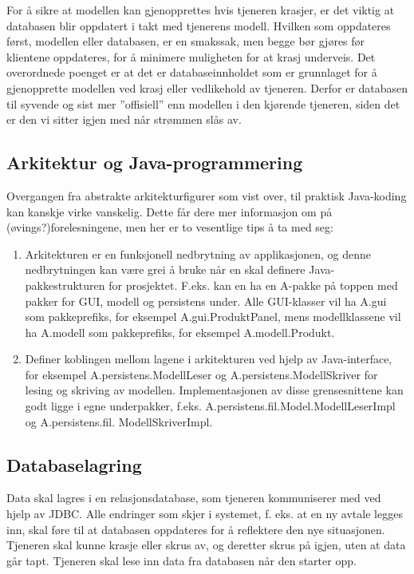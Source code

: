 For å sikre at modellen kan gjenopprettes hvis tjeneren krasjer, er det viktig at databasen blir oppdatert i takt med tjenerens modell. Hvilken som oppdateres først, modellen eller databasen, er en smakssak, men begge bør gjøres før klientene oppdateres, for å minimere muligheten for at krasj underveis. Det overordnede poenget er at det er databaseinnholdet som er grunnlaget for å gjenopprette modellen ved krasj eller vedlikehold av tjeneren. Derfor er databasen til syvende og sist mer ”offisiell” enn modellen i den kjørende tjeneren, siden det er den vi sitter igjen med når strømmen slås av.

\subsection{Arkitektur og Java-programmering}

Overgangen fra abstrakte arkitekturfigurer som vist over, til praktisk Java-koding kan kanskje virke vanskelig. Dette får dere mer informasjon om på (øvings?)forelesningene, men her er to vesentlige tips å ta med seg:

\begin{enumerate}

\item
Arkitekturen er en funksjonell nedbrytning av applikasjonen, og denne nedbrytningen kan være grei å bruke når en skal definere Java-pakkestrukturen for prosjektet. F.eks. kan en ha en A-pakke på toppen med pakker for GUI, modell og persistens under. Alle GUI-klasser vil ha A.gui som pakkeprefiks, for eksempel A.gui.ProduktPanel, mens modellklassene vil ha A.modell som pakkeprefiks, for eksempel A.modell.Produkt.

\item
Definer koblingen mellom lagene i arkitekturen ved hjelp av Java-interface, for eksempel A.persistens.ModellLeser og A.persistens.ModellSkriver for lesing og skriving av modellen. Implementasjonen av disse grensesnittene kan godt ligge i egne underpakker, f.eks. A.persistens.fil.Model.ModellLeserImpl og A.persistens.fil. ModellSkriverImpl.

\end{enumerate}

\subsection{Databaselagring}

Data skal lagres i en relasjonsdatabase, som tjeneren kommuniserer med ved hjelp av JDBC. Alle endringer som skjer i systemet, f. eks. at  en ny avtale legges inn, skal føre til at databasen oppdateres for å reflektere den nye situasjonen. Tjeneren skal kunne krasje eller skrus av, og deretter skrus på igjen, uten at data går tapt. Tjeneren skal lese inn data fra databasen når den starter opp.

